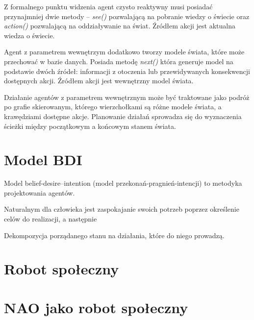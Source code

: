 Z formalnego punktu widzenia agent czysto reaktywny musi posiadać przynajmniej dwie metody – \textit{see()} pozwalającą na pobranie wiedzy o świecie oraz \textit{action()} pozwalającą na oddziaływanie na świat. Źródłem akcji jest aktualna wiedza o świecie.

Agent z parametrem wewnętrzym dodatkowo tworzy modele świata, które może przechować w bazie danych. Posiada metodę \textit{next()} która generuje model na podstawie dwóch źródeł: informacji z otoczenia lub przewidywanych konsekwencji dostępnych akcji. Źródłem akcji jest wewnętrzny model świata. 

Działanie agentów z parametrem wewnętrznym może być traktowane jako podróż po grafie skierowanym, którego wierzchołkami są różne modele świata, a krawędziami dostępne akcje. Planowanie działań sprowadza się do wyznaczenia ścieżki między początkowym a końcowym stanem świata.

\section{Model BDI}
Model belief-desire–intention (model przekonań-pragnień-intencji) to metodyka projektowania agentów. 

Naturalnym dla człowieka jest zaspokajanie swoich potrzeb poprzez określenie celów do realizacji, a następnie 

Dekompozycja porządanego stanu na działania, które do niego prowadzą.

\section{Robot społeczny}

\section{NAO jako robot społeczny}
